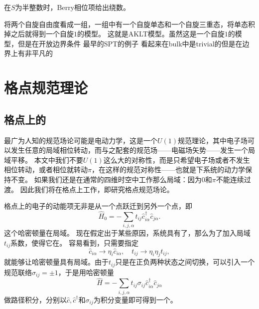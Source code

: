 \documentclass[hyperref, UTF8, a4paper]{ctexart}
\newcommand*{\concept}[1]{\underline{\textbf{#1}}}
\newcommand*{\Ztwo}{$\mathbb{Z}_2$}
\begin{document}
在$S$为半整数时，Berry相位项给出绕数。

将两个自旋自由度看成一组，一组中有一个自旋单态和一个自旋三重态，将单态积掉之后就得到一个自旋$1$的模型。
这就是AKLT模型。虽然这是一个自旋$1$的模型，但是在开放边界条件
最早的SPT的例子
看起来在bulk中是trivial的但是在边界上有非平凡的

\section{格点规范理论}

\subsection{格点上的}\label{sec:z2-on-lattice}

最广为人知的规范场论可能是电动力学，这是一个$U(1)$规范理论，其中电子场可以发生任意的局域相位转动，而与之配套的规范场——电磁场矢势——发生一个局域平移。
本文中我们不要$U(1)$这么大的对称性，而是只希望电子场或者不发生相位转动，或者相位就转动$\pi$，在这样的规范对称性——也就是\concept{}下系统的动力学保持不变。
如果我们还是在通常的四维时空中工作那么局域：因为$0$和$\pi$不能连续过渡。
因此我们将在格点上工作，即研究格点规范场论。

格点上的电子的动能项无非是从一个点跃迁到另外一个点，即
\begin{equation}
    \hat{H}_0 = - \sum_{i, j, \alpha} t_{ij} \hat{c}_{i \alpha}^\dagger \hat{c}_{j \alpha}.
    \label{eq:hopping-hamiltonian}
\end{equation}
这个哈密顿量在局域。
现在假定出于某些原因，系统具有了，那么为了加入局域$t_{ij}$系数，使得它在。
容易看到，只需要指定
\[
    \hat{c}_{i \alpha} \longrightarrow \eta_{i} \hat{c}_{i \alpha}, \quad t_{ij} \longrightarrow \eta_i \eta_j t_{ij},
\]
就能够让哈密顿量具有局域。由于$t_{ij}$只是在正负两种状态之间切换，可以引入一个规范联络$\sigma_{ij} = \pm 1$，于是用哈密顿量
\[
    \hat{H} = - \sum_{i, j, \alpha} t_{ij} \sigma_{ij} \hat{c}_{i \alpha}^\dagger \hat{c}_{j \alpha}
\]
做路径积分，分别以$\hat{c}, \hat{c}^\dagger$和$\sigma_{ij}$为积分变量即可得到一个。
\end{document}
